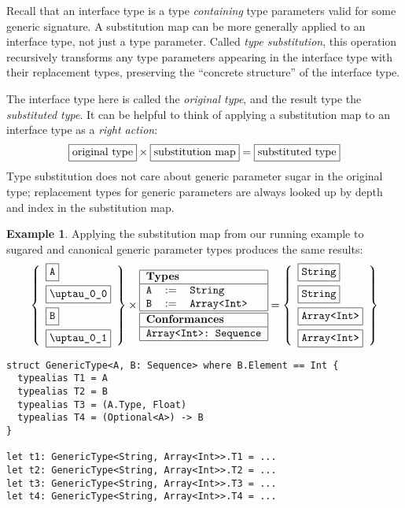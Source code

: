 \documentclass[a4paper,headsepline,bibliography=totoc,toc=flat,fleqn,twoside=semi]{scrbook}
\theoremstyle{definition}
\theoremstyle{definition}
\newtheorem{example}{Example}[chapter]
\theoremstyle{definition}
\newcommand{\mathboxed}[1]{\boxed{\mbox{\vphantom{pI\texttt{pI}}#1}}}
\newcommand{\ttbox}[1]{\boxed{\mbox{\vphantom{pI\texttt{pI}}\texttt{#1}}}}
\newcommand{\ttgp}[2]{\texttt{$\uptau$\_#1\_#2}}
\newcommand{\SubMapC}[2]{\begin{tabular}{|lll|}
\hline
\multicolumn{3}{|l|}{\textbf{Types}}\\
\hline
#1\\
\hline
\hline
\multicolumn{3}{|l|}{\textbf{Conformances}}\\
\hline
#2\\
\hline
\end{tabular}}
\newcommand{\SubType}[2]{\texttt{#1}&$:=$&\texttt{#2}}
\newcommand{\SubConf}[1]{\multicolumn{3}{|l|}{\texttt{#1}}}
\begin{document}
Recall that an interface type is a type \emph{containing} type parameters valid for some generic signature. A substitution map can be more generally applied to an interface type, not just a type parameter. Called \emph{type substitution}, this operation recursively transforms any type parameters appearing in the interface type with their replacement types, preserving the ``concrete structure'' of the interface type.

The interface type here is called the \emph{original type}, and the result type the \emph{substituted type}. It can be helpful to think of applying a substitution map to an interface type as a \emph{right action}:
\[\mathboxed{original type}\times \mathboxed{substitution map} = \mathboxed{substituted type}\]
Type substitution does not care about generic parameter sugar in the original type; replacement types for generic parameters are always looked up by depth and index in the substitution map.

\begin{example}
Applying the substitution map from our running example to sugared and canonical generic parameter types produces the same results:
\[
\left\{
\begin{array}{l}
\ttbox{A}\\[\medskipamount]
\ttbox{\ttgp{0}{0}}\\[\medskipamount]
\ttbox{B}\\[\medskipamount]
\ttbox{\ttgp{0}{1}}
\end{array}\right\}
\times
\SubMapC{
\SubType{A}{String}\\
\SubType{B}{Array<Int>}
}{
\SubConf{Array<Int>:\ Sequence}
}
=
\left\{
\begin{array}{l}
\ttbox{String}\\[\medskipamount]
\ttbox{String}\\[\medskipamount]
\ttbox{Array<Int>}\\[\medskipamount]
\ttbox{Array<Int>}
\end{array}\right\}
\]
\end{example}
\begin{listing}\label{typealiassubstlisting}
\begin{Verbatim}
struct GenericType<A, B: Sequence> where B.Element == Int {
  typealias T1 = A
  typealias T2 = B
  typealias T3 = (A.Type, Float)
  typealias T4 = (Optional<A>) -> B
}

let t1: GenericType<String, Array<Int>>.T1 = ...
let t2: GenericType<String, Array<Int>>.T2 = ...
let t3: GenericType<String, Array<Int>>.T3 = ...
let t4: GenericType<String, Array<Int>>.T4 = ...
\end{Verbatim}
\end{listing}
\end{document}
